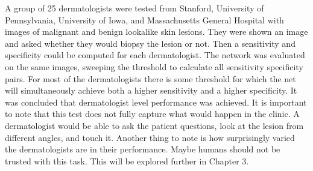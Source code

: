 A group of 25 dermatologists were tested from Stanford, University of Pennsylvania, University of Iowa, and Massachusetts General Hospital with images of malignant and benign lookalike skin lesions.  They were shown an image and asked whether they would biopsy the lesion or not.  Then a sensitivity and specificity could be computed for each dermatologist.  The network was evaluated on the same images, sweeping the threshold to calculate all sensitivity specificity pairs.  For most of the dermatologists there is some threshold for which the net will simultaneously achieve both a higher sensitivity and a higher specificity.  It was concluded that dermatologist level performance was achieved.  It is important to note that this test does not fully capture what would happen in the clinic.  A dermatologist would be able to ask the patient questions, look at the lesion from different angles, and touch it.  Another thing to note is how surprisingly varied the dermatologists are in their performance.  Maybe humans should not be trusted with this task.  This will be explored further in Chapter 3.


